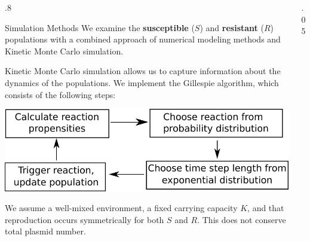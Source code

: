 \documentclass[final]{beamer}
\newlength{\onecolwid}
\newlength{\figwid}
\begin{document}
\begin{frame}[t]
\begin{block}
\begin{columns}[t]
\begin{column}{.8\onecolwid}
  \begin{alertblock}{Simulation Methods}
    We examine the \textbf{susceptible} ($S$) and \textbf{resistant} ($R$) populations
    with a combined approach of numerical modeling methods and Kinetic Monte
    Carlo simulation.

    \quad\quad Kinetic Monte Carlo simulation allows us to
    capture information about the dynamics of the populations. We implement the
    Gillespie algorithm, which consists of the following steps:
    \begin{center}
    \includegraphics[width=\figwid]{../dev/graphics/poster/gillespie.pdf}
    \end{center}

    \quad\quad We assume a well-mixed environment, a fixed carrying capacity $K$, and
    that reproduction occurs symmetrically for both $S$ and $R$. This does not conserve total
    plasmid number.

    \vspace{1ex}
  \end{alertblock}
\end{column}
\begin{column}{.05\onecolwid}\end{column} %


\end{columns}
\end{block}
\end{frame}
\end{document}
